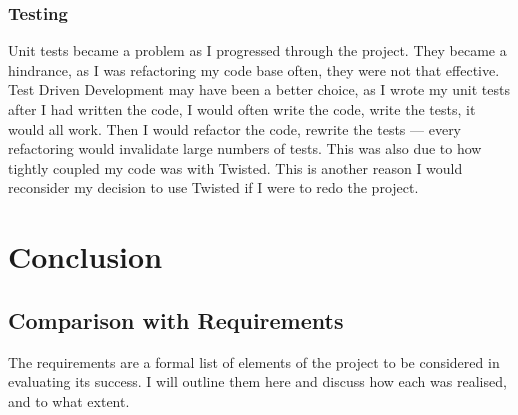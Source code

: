 \documentclass[12pt,twoside,notitlepage]{report}
\begin{document}
\subsection*{Testing}

Unit tests became a problem as I progressed through the project. They became a hindrance, as I
was refactoring my code base often, they were not that effective. Test Driven Development may have
been a better choice, as I wrote my unit tests after I had written the code, I would often write
the code, write the tests, it would all work. Then I would refactor the code, rewrite the tests ---
every refactoring would invalidate large numbers of tests. This was also due to how tightly
coupled my code was with Twisted. This is another reason I would reconsider my decision to use
Twisted if I were to redo the project.




\cleardoublepage
\chapter{Conclusion}

\section{Comparison with Requirements}

The requirements are a formal list of elements of the project to be
considered in evaluating its success. I will outline them here and discuss how each was realised,
and to what extent.
\end{document}
